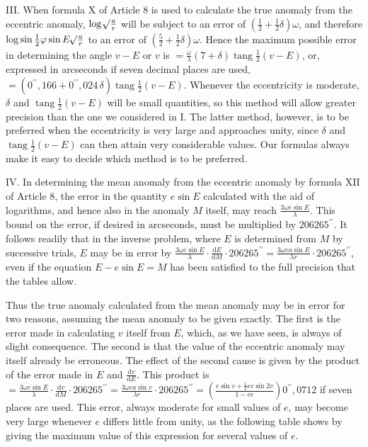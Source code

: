 III. When formula X of Article 8 is used to calculate the true anomaly from the eccentric anomaly, $\log\mathord{{}^{}\!\surd}\frac{a}{r}$ will be subject to an error of $(\frac{1}{2}+\frac{1}{2}\delta)\omega$, and therefore $\log\sin\frac{1}{2}\varphi\sin E\mathord{{}^{}\!\surd}\frac{a}{r}$ to an error of $(\frac{5}{2}+\frac{1}{2}\delta)\omega$. Hence the maximum possible error in determining the angle $v-E$ or $v$ is $=\frac{\omega}{\lambda}(7+\delta)\operatorname{tang}\frac{1}{2}(v-E)$, or, expressed in arcseconds if seven decimal places are used, $=(0^{\prime\prime}{,}166+0^{\prime\prime}{,}024\,\delta)\operatorname{tang}\frac{1}{2}(v-E)$. Whenever the eccentricity is moderate, $\delta$ and $\operatorname{tang}\frac{1}{2}(v-E)$ will be small quantities, so this method will allow greater precision than the one we considered in I. The latter method, however, is to be preferred when the eccentricity is very large and approaches unity, since $\delta$ and $\operatorname{tang}\frac{1}{2}(v-E)$ can then attain very considerable values. Our formulas always make it easy to decide which method is to be preferred.

IV. In determining the mean anomaly from the eccentric anomaly by formula XII of Article 8, the error in the quantity $e\sin E$ calculated with the aid of logarithms, and hence also in the anomaly $M$ itself, may reach $\frac{3\omega e\sin E}{\lambda}$. This bound on the error,
if desired in arcseconds, must be multiplied by $206265^{\prime\prime}$. It follows readily that in the inverse problem, where $E$ is determined from $M$ by successive trials, $E$ may be in error by $\frac{3\omega e\sin E}{\lambda}\cdot\frac{\mathrm{d}E}{\mathrm{d}M}\cdot206265^{\prime\prime}=\frac{3\omega ea\sin E}{\lambda r}\cdot206265^{\prime\prime}$, even if the equation $E-e\sin E=M$ has been satisfied to the full precision that the tables allow.

Thus the true anomaly calculated from the mean anomaly may be in error for two reasons, assuming the mean anomaly to be given exactly. The first is the error made in calculating $v$ itself from $E$, which, as we have seen, is always of slight consequence. The second is that the value of the eccentric anomaly may itself already be erroneous. The effect of the second cause is given by the product of the error made in $E$ and $\frac{\mathrm{d}v}{\mathrm{d}E}$. This product is $=\frac{3\omega e\sin E}{\lambda}\cdot\frac{\mathrm{d}v}{\mathrm{d}M}\cdot206265^{\prime\prime}=\frac{3\omega ea\sin v}{\lambda r}\cdot206265^{\prime\prime}=\left(\frac{e\sin v+\frac{1}{2}ee\sin 2v}{1-ee}\right)0^{\prime\prime}{,}0712$ if seven places are used. This error, always moderate for small values of $e$, may become very large whenever $e$ differs little from unity, as the following table shows by giving the maximum value of this expression for several values of $e$.

